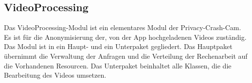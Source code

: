 \subsection{VideoProcessing} \label{service:modul:VideoProcessing}
Das VideoProcessing-Modul ist ein elementares Modul der Privacy-Crash-Cam. Es ist für die Anonymisierung der, von der App hochgeladenen Videos zuständig.\newline
Das Modul ist in ein Haupt- und ein Unterpaket gegliedert. Das Hauptpaket übernimmt die Verwaltung der Anfragen und die Verteilung der Rechenarbeit auf die Vorhandenen Resourcen. Das Unterpaket  beinhaltet alle Klassen, die die Bearbeitung des Videos umsetzen.